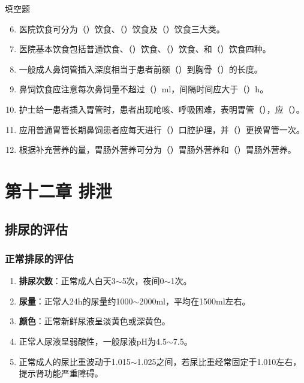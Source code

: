 \documentclass[11pt, a4paper]{ctexart}
\begin{document}
\begin{tipsbox}{填空题}
	\begin{enumerate}
		\setcounter{enumi}{5}
		\item 医院饮食可分为（\qquad）饮食、（\qquad）饮食及（\qquad）饮食三大类。
		\item 医院基本饮食包括普通饮食、（\qquad）饮食、（\qquad）饮食、和（\qquad）饮食四种。
		\item 一般成人鼻饲管插入深度相当于患者前额（\qquad）到胸骨（\qquad）的长度。
		\item 鼻饲饮食应注意每次鼻饲量不超过（\qquad）ml，间隔时间应大于（\qquad）h。
		\item 护士给一患者插入胃管时，患者出现呛咳、呼吸困难，表明胃管（\qquad），应（\qquad）。
		\item 应用普通胃管长期鼻饲患者应每天进行（\qquad）口腔护理，并（\qquad）更换胃管一次。
		\item 根据补充营养的量，胃肠外营养可分为（\qquad）胃肠外营养和（\qquad）胃肠外营养。
	\end{enumerate}
\end{tipsbox}

\section{第十二章 排泄}
\subsection{排尿的评估}
\subsubsection{正常排尿的评估}
\begin{enumerate}
	\item \textbf{排尿次数}：正常成人白天3$\sim$5次，夜间0$\sim$1次。
	\item \textbf{尿量}：正常人24h的尿量约1000$\sim$2000ml，平均在1500ml左右。
	\item \textbf{颜色}：正常新鲜尿液呈淡黄色或深黄色。
	\item 正常人尿液呈弱酸性，一般尿液pH为4.5$\sim$7.5。
	\item 正常成人的尿比重波动于1.015$\sim$1.025之间，若尿比重经常固定于1.010左右，提示肾功能严重障碍。
\end{enumerate}
\end{document}
